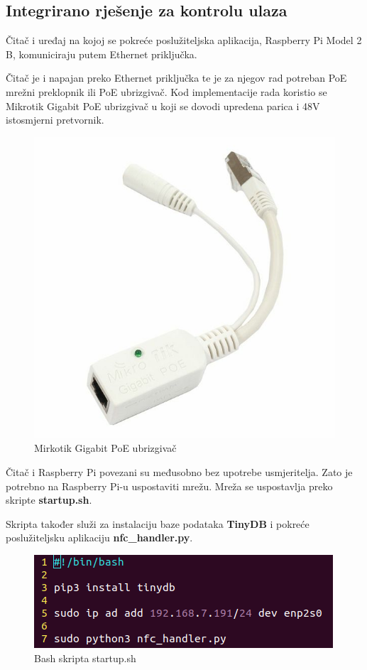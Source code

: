 \documentclass[times, utf8, zavrsni]{fer}
\begin{document}
\newpage

\subsection{Integrirano rješenje za kontrolu ulaza}
Čitač i uređaj na kojoj se pokreće poslužiteljska aplikacija, Raspberry Pi Model 2 B, komuniciraju putem Ethernet priključka. \par 
Čitač je i napajan preko Ethernet priključka te je za njegov rad potreban PoE mrežni preklopnik ili PoE ubrizgivač. Kod implementacije rada koristio se Mikrotik Gigabit PoE ubrizgivač u koji se dovodi upredena parica i 48V istosmjerni pretvornik. 

\begin{figure}[h]
\includegraphics[scale=0.3]{poe.jpg}
\centering
\caption{Mirkotik Gigabit PoE ubrizgivač}
\centering
\end{figure}

Čitač i Raspberry Pi povezani su međusobno bez upotrebe usmjeritelja. Zato je potrebno na Raspberry Pi-u uspostaviti mrežu. Mreža se uspostavlja preko skripte \textbf{startup.sh}.\par 
Skripta također služi za instalaciju baze podataka \textbf{TinyDB} i pokreće poslužiteljsku aplikaciju \textbf{nfc\_handler.py}.

\begin{figure}[h]
\includegraphics[scale=0.6]{skripta.png}
\centering
\caption{Bash skripta startup.sh}
\centering
\end{figure}
\end{document}
